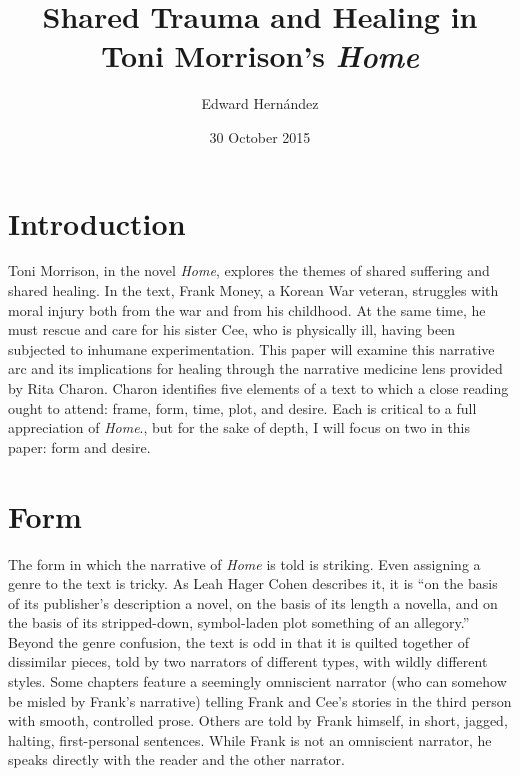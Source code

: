 \documentclass[12pt]{article}
\begin{document}
\title{Shared Trauma and Healing in Toni Morrison's \emph{Home}}
\author{Edward Hern\'{a}ndez}
\date{30 October 2015}

\maketitle


\vspace{12pt}

\section{Introduction}

Toni Morrison, in the novel \emph{Home}\autocite{Morrison12}, explores the
themes of shared suffering and shared healing. In the text, Frank Money, a
Korean War veteran, struggles with moral injury both from the war and from his
childhood. At the same time, he must rescue and care for his sister Cee, who is
physically ill, having been subjected to inhumane experimentation.  This paper
will examine this narrative arc and its implications for healing through the
narrative medicine lens provided by Rita Charon.\autocite[ch.~6]{Charon06}
Charon identifies five elements of a text to which a close reading ought to
attend: frame, form, time, plot, and desire. Each is critical to a full
appreciation of \emph{Home}., but for the sake of depth, I will focus on two in
this paper: form and desire.

\section{Form}

The form in which the narrative of \emph{Home} is told is striking. Even
assigning a genre to the text is tricky. As Leah Hager Cohen describes it, it
is ``on the basis of its publisher’s description a novel, on the basis of its
length a novella, and on the basis of its stripped-down, symbol-laden plot
something of an allegory.''\autocite{Cohen12} Beyond the genre confusion, the
text is odd in that it is quilted together of dissimilar pieces, told by two
narrators of different types, with wildly different styles. Some chapters
feature a seemingly omniscient narrator (who can somehow be misled by Frank's
narrative) telling Frank and Cee's stories in the third person with smooth,
controlled prose. Others are told by Frank himself, in short, jagged, halting,
first-personal sentences. While Frank is not an omniscient narrator, he speaks
directly with the reader and the other narrator.
\end{document}
